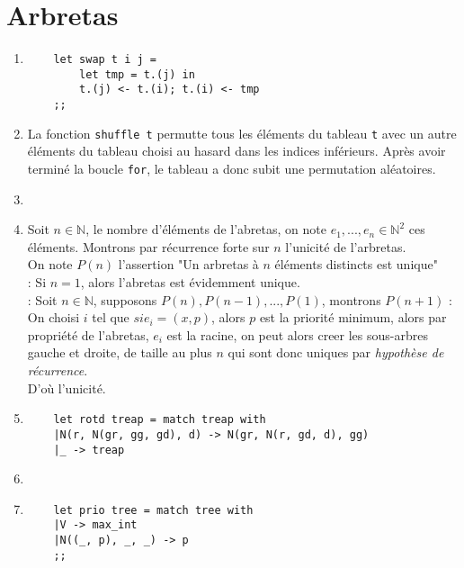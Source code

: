 \documentclass{article}
\newcommand{\bb}[1]{\mathbb{#1}}
\newcommand{\image}[3]{ %
    \begin{minipage}[t]{\linewidth}
        #1
              \adjustbox{valign=t}{%
                \texttt{[image: \#3]}%
              }
    \end{minipage}}
\begin{document}
\section{Arbretas}

\begin{enumerate}

\item \begin{verbatim}
    let swap t i j =
        let tmp = t.(j) in
        t.(j) <- t.(i); t.(i) <- tmp
    ;;
\end{verbatim}

\item La fonction \texttt{shuffle t} permutte tous les éléments du tableau \texttt{t} avec un autre éléments du tableau
choisi au hasard dans les indices inférieurs. Après avoir terminé la boucle \texttt{for}, le tableau a donc subit une permutation
aléatoires.

\item \image{\raggedright}{0.25}{img/III_3.pdf}

\item Soit $n \in \bb{N}$, le nombre d'éléments de l'abretas, on note $e_1, ..., e_n \in \bb{N}^2$ ces éléments.
Montrons par récurrence forte sur $n$ l'unicité de l'arbretas. \\
On note $P(n)$ l'assertion "Un arbretas à $n$ éléments distincts est unique" \\
 : Si $n = 1$, alors l'abretas est évidemment unique. \\
 : Soit $n \in \bb{N}$, supposons $P(n), P(n-1), ..., P(1)$, montrons $P(n+1)$ :
On choisi $i$ tel que $si e_i = (x, p)$, alors $p$ est la priorité minimum, alors par propriété de l'abretas, $e_i$ est la racine,
on peut alors creer les sous-arbres gauche et droite, de taille au plus $n$ qui sont donc uniques par {\it hypothèse de récurrence}. \\
D'où l'unicité. 

\item \begin{verbatim}
    let rotd treap = match treap with
    |N(r, N(gr, gg, gd), d) -> N(gr, N(r, gd, d), gg)
    |_ -> treap
\end{verbatim}


\item \image{\raggedright}{}{img/III_6.pdf}

\item \begin{verbatim}
    let prio tree = match tree with
    |V -> max_int
    |N((_, p), _, _) -> p
    ;;
\end{verbatim}


\end{enumerate}
\end{document}
